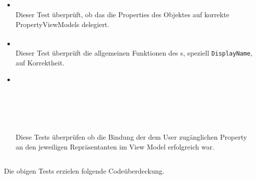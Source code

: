 \subsection{}

\paragraph{}

\begin{itemize}

\item{}~\\
Dieser Test überprüft, ob das  die Properties des Objektes auf korrekte PropertyViewModels delegiert.

\end{itemize}

\paragraph{}

\begin{itemize}

	\item {} \\
	Dieser Test überprüft die allgemeinen Funktionen des s, speziell \verb#DisplayName#, auf Korrektheit.
	\item {} \\
	 \\
	 \\
	 \\
	 \\
	 \\
	Diese Tests überprüfen ob die Bindung der dem User zugänglichen Property an den jeweiligen Repräsentanten im View Model erfolgreich war.

\end{itemize}

\subsection{}
Die obigen Tests erzielen folgende Codeüberdeckung.


